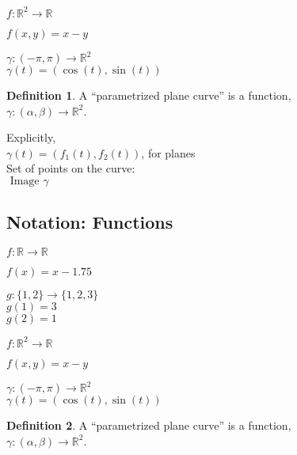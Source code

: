 \documentclass[twocolumn,20pt,fleqn]{extarticle}
\newcommand{\sep}{\vspace{0.5cm}}
\theoremstyle{plain}
\theoremstyle{definition}
\newtheorem*{definition}{Definition}
\theoremstyle{remark}
\begin{document}
$ f: \mathbb{R}^2  \to \mathbb{R}$

$f(  x,y  ) = x - y$


\sep

$\gamma :  (-\pi,\pi)  \to \mathbb{R}^2$\\
$\gamma(t) = (\cos(t), \sin(t))$



\newpage



\begin{definition}
  A  ``parametrized plane curve''  is a  function,\\ $\gamma  : (\alpha, \beta) \to \mathbb{R}^2$.
\end{definition}

Explicitly,\\
$\gamma(t) = (f_1(t), f_2(t))$, for planes\\

Set of points on the curve:\\  $\textrm{ Image } \gamma $


\clearpage




\subsection{Notation: Functions}

$ f: \mathbb{R}  \to \mathbb{R}$

$f(x) = x - 1.75$\\

\sep

  $g : \{1,2\} \to \{1,2,3\}$\\
    $g(1) = 3$\\
    $g(2) = 1$\\

\sep

$ f: \mathbb{R}^2  \to \mathbb{R}$

$f(  x,y  ) = x - y$


\sep

$\gamma :  (-\pi,\pi)  \to \mathbb{R}^2$\\
$\gamma(t) = (\cos(t), \sin(t))$



\newpage



\begin{definition}
  A  ``parametrized plane curve''  is a  function,\\ $\gamma  : (\alpha, \beta) \to \mathbb{R}^2$.
\end{definition}
\end{document}
